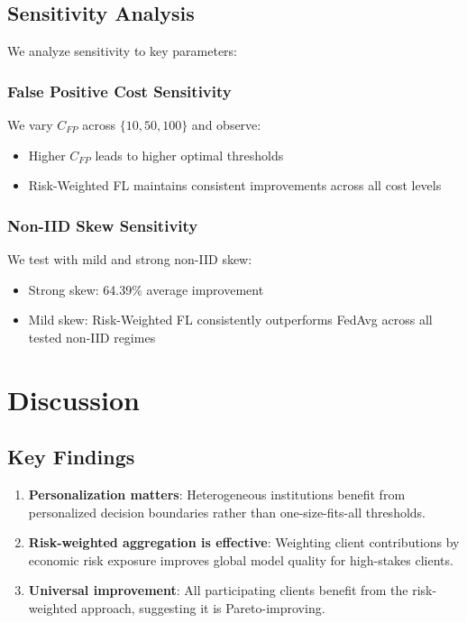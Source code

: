 \documentclass[conference]{IEEEtran}
\begin{document}
\subsection{Sensitivity Analysis}

We analyze sensitivity to key parameters:

\subsubsection{False Positive Cost Sensitivity}

We vary $C_{FP}$ across $\{10, 50, 100\}$ and observe:
\begin{itemize}
    \item Higher $C_{FP}$ leads to higher optimal thresholds
    \item Risk-Weighted FL maintains consistent improvements across all cost levels
\end{itemize}

\subsubsection{Non-IID Skew Sensitivity}

We test with mild and strong non-IID skew:
\begin{itemize}
    \item Strong skew: 64.39\% average improvement
    \item Mild skew: Risk-Weighted FL consistently outperforms FedAvg across all tested non-IID regimes
\end{itemize}

\section{Discussion}
\label{sec:discussion}

\subsection{Key Findings}

\begin{enumerate}
    \item \textbf{Personalization matters}: Heterogeneous institutions benefit from personalized decision boundaries rather than one-size-fits-all thresholds.
    
    \item \textbf{Risk-weighted aggregation is effective}: Weighting client contributions by economic risk exposure improves global model quality for high-stakes clients.
    
    \item \textbf{Universal improvement}: All participating clients benefit from the risk-weighted approach, suggesting it is Pareto-improving.
\end{enumerate}
\end{document}

